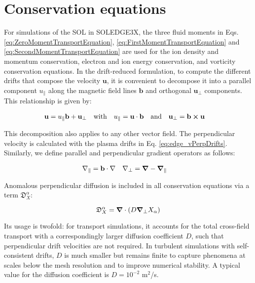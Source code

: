 \section{Conservation equations}
\label{sec:S3X_TransportEquations}

For simulations of the SOL in SOLEDGE3X, the three fluid moments in Eqs. \ref{eq:ZeroMomentTransportEquation}, \ref{eq:FirstMomentTransportEquation} and \ref{eq:SecondMomentTransportEquation} are used for the ion density and momentum conservation, electron and ion energy conservation, and vorticity conservation equations. In the drift-reduced formulation, to compute the different drifts that compose the velocity $\mathbf{u}$, it is convenient to decompose it into a parallel component $u_\parallel$ along the magnetic field lines $\mathbf{b}$ and orthogonal $\mathbf{u}_\perp$ components. This relationship is given by:

\begin{align}
	\label{eq:RelationPerpParallelVelocity}
	\mathbf{u} &= u_\parallel \mathbf{b} + \mathbf{u}_\perp & \text{with} \quad u_\parallel = \mathbf{u}\cdot\mathbf{b} \quad &\text{and} \quad \mathbf{u}_\perp = \mathbf{b}\cross\mathbf{u}
\end{align}

This decomposition also applies to any other vector field. The perpendicular velocity is calculated with the plasma drifts in Eq. \ref{eq:edge_vPerpDrifts}. Similarly, we define parallel and perpendicular gradient operators as follows:

\begin{align}
	\nabla_\parallel &= \mathbf{b}\cdot\nabla & \nabla_\perp &= \grad - \grad_\parallel
\end{align}

Anomalous perpendicular diffusion is included in all conservation equations via a term $\mathfrak{D}_X^\alpha$:

\begin{equation}
	\mathfrak{D}_X^\alpha = \grad\cdot\left(D\grad_\perp X_\alpha\right)
\end{equation}

Its usage is twofold: for transport simulations, it accounts for the total cross-field transport with a correspondingly larger diffusion coefficient $D$, such that perpendicular drift velocities are not required. In turbulent simulations with self-consistent drifts, $D$ is much smaller but remains finite to capture phenomena at scales below the mesh resolution and to improve numerical stability. A typical value for the diffusion coefficient is $D = 10^{-2}$ m$^2$/s. \\

